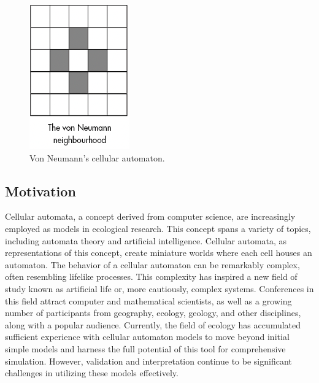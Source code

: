 \documentclass[9pt,a4paper,twoside]{tau-class/tau}
\begin{document}
    \begin{figure}[H]
        \centering
        \includegraphics[width=0.75\columnwidth]{figures/vonNeumann.png}
        \caption{Von Neumann's cellular automaton.}
        \label{fig:vonNeumann}
    \end{figure}



    \subsection{Motivation}
    
    
    Cellular automata, a concept derived from computer science, are increasingly employed as models in ecological research. This concept spans a variety of topics, including automata theory and artificial intelligence. 
    Cellular automata, as representations of this concept, create miniature worlds where each cell houses an automaton. The behavior of a cellular automaton can be remarkably complex, often resembling lifelike processes. 
    This complexity has inspired a new field of study known as artificial life or, more cautiously, complex systems. Conferences in this field attract computer and mathematical scientists, as well as a growing number of participants from geography, ecology, geology, and other disciplines, along with a popular audience. 
    Currently, the field of ecology has accumulated sufficient experience with cellular automaton models to move beyond initial simple models and harness the full potential of this tool for comprehensive simulation. 
    However, validation and interpretation continue to be significant challenges in utilizing these models effectively.\cite{DEWDNEY2008541}
\end{document}

